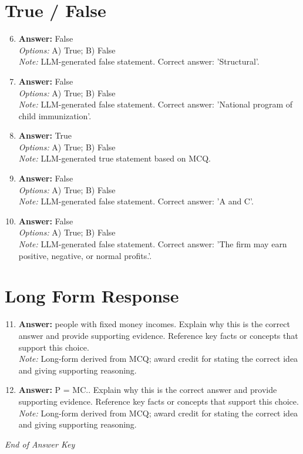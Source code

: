 \documentclass[12pt]{article}
\begin{document}
\section*{True / False}
\begin{enumerate}[label=\arabic*.]
\setcounter{enumi}{5}
\item \textbf{Answer:} False
\\ \textit{Options:} A) True; B) False
\\ \textit{Note:} LLM-generated false statement. Correct answer: 'Structural'.
\item \textbf{Answer:} False
\\ \textit{Options:} A) True; B) False
\\ \textit{Note:} LLM-generated false statement. Correct answer: 'National program of child immunization'.
\item \textbf{Answer:} True
\\ \textit{Options:} A) True; B) False
\\ \textit{Note:} LLM-generated true statement based on MCQ.
\item \textbf{Answer:} False
\\ \textit{Options:} A) True; B) False
\\ \textit{Note:} LLM-generated false statement. Correct answer: 'A and C'.
\item \textbf{Answer:} False
\\ \textit{Options:} A) True; B) False
\\ \textit{Note:} LLM-generated false statement. Correct answer: 'The firm may earn positive, negative, or normal profits.'.
\end{enumerate}

\section*{Long Form Response}
\begin{enumerate}[label=\arabic*.]
\setcounter{enumi}{10}
\item \textbf{Answer:} people with fixed money incomes. Explain why this is the correct answer and provide supporting evidence. Reference key facts or concepts that support this choice.
\\ \textit{Note:} Long-form derived from MCQ; award credit for stating the correct idea and giving supporting reasoning.
\item \textbf{Answer:} P = MC.. Explain why this is the correct answer and provide supporting evidence. Reference key facts or concepts that support this choice.
\\ \textit{Note:} Long-form derived from MCQ; award credit for stating the correct idea and giving supporting reasoning.
\end{enumerate}

\vfill
\noindent\textit{End of Answer Key}
\end{document}
